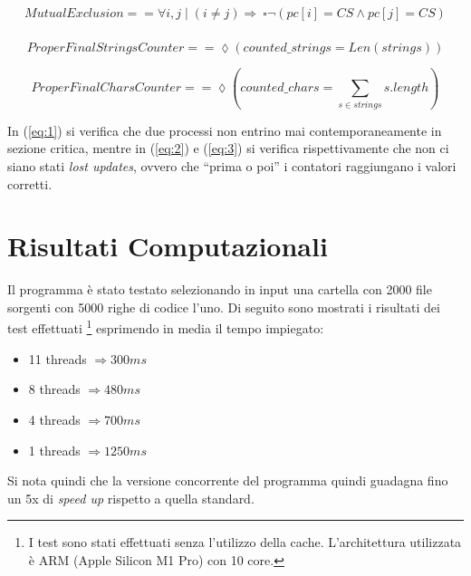 \documentclass{article}
\begin{document}
\begin{equation} \label{eq:1}
\begin{split}
    MutualExclusion == \forall i,j \mid (i \neq j) \Rightarrow \ \square\lnot (pc[i] = CS \land pc[j] = CS) \\
\end{split}
\end{equation}

\begin{equation} \label{eq:2}
    ProperFinalStringsCounter == \lozenge(counted\_strings = Len(strings))
\end{equation}

\begin{equation} \label{eq:3}
    ProperFinalCharsCounter == \lozenge(counted\_chars = \sum_{s \in strings} s.length )
\end{equation}

In (\ref{eq:1}) si verifica che due processi non entrino mai contemporaneamente in sezione critica, mentre in (\ref{eq:2}) e (\ref{eq:3}) si verifica rispettivamente che non ci siano stati \textit{lost updates}, ovvero che ``prima o poi'' i contatori raggiungano i valori corretti.


\section{Risultati Computazionali}
Il programma è stato testato selezionando in input una cartella con 2000 file sorgenti con 5000 righe di codice l'uno.
Di seguito sono mostrati i risultati dei test effettuati \footnote{I test sono stati effettuati senza l'utilizzo della cache. L'architettura utilizzata è ARM (Apple Silicon M1 Pro) con 10 core.} esprimendo in media il tempo impiegato:
\begin{itemize}
    \item 11 threads $\Rightarrow 300 ms$
    \item 8 threads $\Rightarrow 480 ms$
    \item 4 threads $\Rightarrow 700 ms$
    \item 1 threads $\Rightarrow 1250 ms$
\end{itemize}
Si nota quindi che la versione concorrente del programma quindi guadagna fino un 5x di \textit{speed up} rispetto a quella standard.

\clearpage
\end{document}
